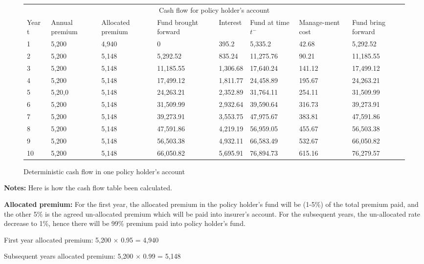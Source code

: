\documentclass{report}
\begin{document}
\begin{figure}[H]
\begin{tabular}{p{1cm} p{1.5cm} p{1.5cm} p{2cm} p{1.5cm} p{2cm} p{1.5cm} p{1.5cm} }
\toprule
\multicolumn{8}{c}{Cash flow for policy holder's account} \\
\cmidrule(r){3-7}

Year t & Annual premium & Allocated premium & Fund brought forward & Interest & Fund at time $t^-$ & Manage-ment cost & Fund bring forward \\
\midrule
1	&5,200	&4,940	&0&	395.2	&5,335.2	&42.68	&5,292.52\\
2	&5,200	&5,148	&5,292.52	 &   835.24	&11,275.76 &	90.21	&11,185.55\\
3	&5,200	&5,148	&11,185.55&  1,306.68	&17,640.24	&141.12  &17,499.12\\
4&	5,200	&5,148	&17,499.12&  1,811.77&	24,458.89	&    195.67       &24,263.21\\
5&	5,20,0	&5,148&	24,263.21	&    2,352.89&	31,764.11	&   254.11	&31,509.99\\
6&	5,200	&5,148&	31,509.99	&   2,932.64&	39,590.64	&   316.73	&39,273.91\\
7&	5,200	&5,148&	39,273.91	&   3,553.75&	47,975.67	&   383.81	&47,591.86\\
8&	5,200	&5,148&	47,591.86	&   4,219.19&	56,959.05	&  455.67	    &56,503.38\\
9&	5,200	&5,148&	56,503.38	&   4,932.11&	66,583.49	&  532.67 	&66,050.82\\
10&	5,200	&5,148	&66,050.82	&5,695.91	&76,894.73	&615.16	&76,279.57\\
\bottomrule
\end{tabular}
\label{determ-PHcashflow}
\caption{Deterministic cash flow in one policy holder's account}
\end{figure}




\textbf{Notes:} Here is how the cash flow table been calculated.

\textbf{Allocated premium:} For the first year, the allocated premium in the policy holder's fund will be (1-5\%) of the total premium paid, and the other 5\% is the agreed un-allocated premium which will be paid into insurer's account. For the subsequent years, the un-allocated rate decrease to 1\%, hence there will be 99\% premium paid into policy holder's fund.


First year allocated premium:                5,200 $\times$ 0.95 = 4,940

Subsequent years allocated premium:   5,200 $\times$ 0.99 = 5,148
\end{document}
